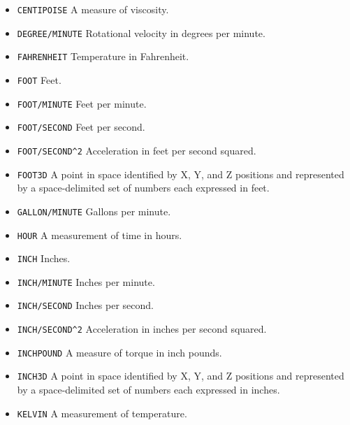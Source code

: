 \begin{itemize}
\begin{itemize}
\item \texttt{CENTIPOISE} \newline A measure of viscosity. 
\item \texttt{DEGREE/MINUTE} \newline Rotational velocity in degrees per minute. 
\item \texttt{FAHRENHEIT} \newline Temperature in Fahrenheit. 
\item \texttt{FOOT} \newline Feet. 
\item \texttt{FOOT/MINUTE} \newline Feet per minute. 
\item \texttt{FOOT/SECOND} \newline Feet per second. 
\item \texttt{FOOT/SECOND\^{}2} \newline Acceleration in feet per second squared. 
\item \texttt{FOOT\textunderscore 3D} \newline A point in space identified by X, Y, and Z positions and represented by a space-delimited set of numbers each expressed in feet. 
\item \texttt{GALLON/MINUTE} \newline Gallons per minute. 
\item \texttt{HOUR} \newline A measurement of time in hours. 
\item \texttt{INCH} \newline Inches. 
\item \texttt{INCH/MINUTE} \newline Inches per minute. 
\item \texttt{INCH/SECOND} \newline Inches per second. 
\item \texttt{INCH/SECOND\^{}2} \newline Acceleration in inches per second squared. 
\item \texttt{INCH\textunderscore POUND} \newline A measure of torque in inch pounds. 
\item \texttt{INCH\textunderscore 3D} \newline A point in space identified by X, Y, and Z positions and represented by a space-delimited set of numbers each expressed in inches. 
\item \texttt{KELVIN} \newline A measurement of temperature. 

\end{itemize}
\end{itemize}
